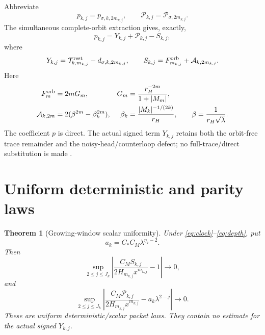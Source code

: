 \documentclass[11pt]{article}
\newtheorem{theorem}{Theorem}[section]
\theoremstyle{remark}
\newcommand{\cP}{\mathcal P}
\newcommand{\cA}{\mathcal A}
\newcommand{\cT}{\mathcal T}
\begin{document}
Abbreviate
\[
 p_{k,j}=p_{\sigma,k,2m_{k,j}},\qquad
 \cP_{k,j}=\cP_{\sigma,2m_{k,j}}.
\]
The simultaneous complete-orbit extraction gives, exactly,
\begin{equation}\label{eq:coefficient}
 \boxed{
 p_{k,j}=Y_{k,j}+\cP_{k,j}-S_{k,j},}
\end{equation}
where
\begin{equation}\label{eq:YS}
 Y_{k,j}=\cT_{k,m_{k,j}}^{\rm rest}
          -d_{\sigma,k,2m_{k,j}},\qquad
 S_{k,j}=F_{m_{k,j}}^{\rm orb}+\cA_{k,2m_{k,j}}.
\end{equation}
Here
\begin{align}
 F_m^{\rm orb}&=2mG_m,
 &G_m&=\frac{r_H^{-2m}}{1+|M_m|},\label{eq:orbit}\\
 \cA_{k,2m}&=2(\beta^{2m}-\beta_k^{2m}),
 &\beta_k&=\frac{|M_k|^{-1/(2k)}}{r_H},
 \qquad \beta=\frac1{r_H\sqrt\lambda}.\label{eq:radial}
\end{align}
The coefficient $p$ is direct.  The actual signed term $Y_{k,j}$ retains
both the orbit-free trace remainder and the noisy-head/counterloop defect;
no full-trace/direct substitution is made
\citep{WangObservation2026,WangTwoSidebands2026}.

\section{Uniform deterministic and parity laws}

\begin{theorem}[Growing-window scalar uniformity]
\label{thm:uniformity}
Under \eqref{eq:clock}--\eqref{eq:depth}, put
\begin{equation}\label{eq:a-k}
 a_k=C_*C_M\lambda^{\eta_k-2}.
\end{equation}
Then
\begin{equation}\label{eq:demand-uniform}
 \boxed{
 \sup_{2\le j\le J_k}
 \left|
 \frac{C_MS_{k,j}}{2H_{m_{k,j}}x^{m_{k,j}}}-1
 \right|\longrightarrow0,}
\end{equation}
and
\begin{equation}\label{eq:parity-uniform}
 \boxed{
 \sup_{2\le j\le J_k}
 \left|
 \frac{C_M\cP_{k,j}}{2H_{m_{k,j}}x^{m_{k,j}}}
 -a_k\lambda^{2-j}
 \right|\longrightarrow0.}
\end{equation}
These are uniform deterministic/scalar packet laws.  They contain no
estimate for the actual signed $Y_{k,j}$.
\end{theorem}
\end{document}
